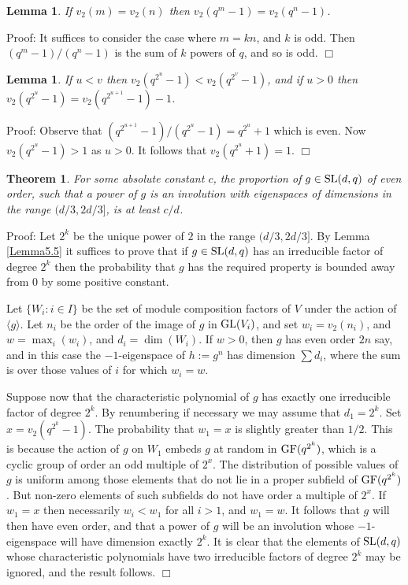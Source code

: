 \documentclass[12pt]{article}
\newtheorem{lemma}[definition]{Lemma}
\newtheorem{theorem}[definition]{Theorem}
\newenvironment{proof}{\normalsize {\sc Proof}:}{{\hfill $\Box$ \\}}
\def\SL{{\rm SL}}
\def\GL{{\rm GL}}
\def\GF{{\rm GF}}
\begin{document}
\begin{lemma}\label{Lemma5.6} If $v_2(m)=v_2(n)$ then $v_2(q^m-1) = v_2(q^n-1)$.
\end{lemma}
\begin{proof} 
 It suffices to consider the case where $m=kn$, and $k$ is odd.
Then $(q^m-1)/(q^n-1)$ is the sum of $k$ powers of $q$, and so is odd.
\end{proof}

\begin{lemma}\label{Lemma5.7} If $u<v$ then $v_2(q^{2^u}-1)<v_2(q^{2^v}-1)$, 
and if $u>0$ then $v_2(q^{2^u}-1) =v_2(q^{2^{u+1}}-1)-1$.
\end{lemma}
\begin{proof} 
Observe that $(q^{2^{u+1}}-1)/(q^{2^u}-1)=q^{2^u}+1$ which is even. Now
$v_2(q^{2^u}-1)>1$ as $u>0$. It follows that $v_2(q^{2^u}+1)=1$.
\end{proof}

\begin{theorem}\label{Theorem5.1}  
For some absolute constant $c$, the proportion
of $g \in \SL(d,q)$ of even order, such that a power of $g$
is an involution with eigenspaces of dimensions in the range
$(d/3,2d/3]$, is at least $c/d$.
\end{theorem}
\begin{proof} 
Let $2^k$ be the unique power of $2$ in the range
$(d/3,2d/3]$. By Lemma \ref{Lemma5.5} it suffices to prove that 
if $g\in\SL(d,q)$
has an  irreducible factor of degree $2^k$ then the probability that
$g$ has the required property is bounded away from 0 by some positive
constant. 

Let $\{W_i:i\in I\}$ be the set of module composition factors of $V$
under the action of $\langle g\rangle$. Let $n_i$ be the order of the
image of $g$ in $\GL(V_i)$, and set $w_i=v_2(n_i)$, and
$w=\max_i(w_i)$, and $d_i=\dim(W_i)$. 
If $w>0$, then $g$ has even order $2n$  say,
and in  this case the $-1$-eigenspace of $h :=  g^n$ has
dimension $\sum d_i$, where the sum is over those values of $i$ for
which $w_i=w$. 

Suppose now that the characteristic polynomial of $g$
has exactly one irreducible factor of degree $2^k$. By renumbering if
necessary we may assume that $d_1=2^k$. Set $x=v_2(q^{2^k}-1)$.  The
probability that $w_1=x$ is slightly greater than $1/2$. This is
because the action of $g$ on $W_1$ embeds $g$ at random in
$\GF(q^{2^k})$, which is a cyclic group of order an odd multiple of
$2^x$. The distribution of possible values of $g$ is uniform among
those elements that do not lie in a proper subfield of $\GF(q^{2^k})$.
But non-zero elements of such subfields do not have order a multiple
of $2^x$. If $w_1=x$ then necessarily $w_i<w_1$ for all $i>1$,
and $w_1=w$. It follows that $g$ will then have even order, and that
a power of $g$ will be an involution whose $-1$-eigenspace will have
dimension exactly $2^k$. It is clear that the elements of $\SL(d,q)$
whose characteristic polynomials have two irreducible factors of
degree $2^k$ may be ignored, and the result follows.
\end{proof}
\end{document}
